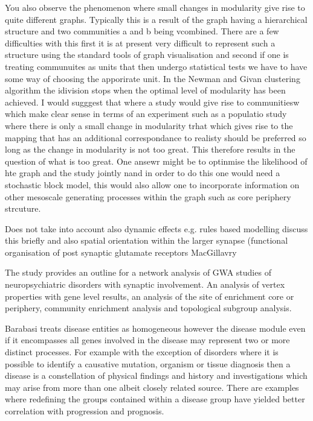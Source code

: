 You also observe the phenomenon where small changes in modularity give rise to quite different graphs. Typically this is a result of the graph having a hierarchical structure and two communities a and b being vcombined. There are a few difficulties with this first it is at present very difficult to represent such a structure using the standard tools of graph visualisation and second if one is treating communuites as units that then undergo statistical tests we have to have some way of choosing the apporirate unit. In the Newman and Givan clustering algorithm the idivision stops when the optimal level of modularity has been achieved. I would sugggest that where a study would give rise to communitiesw which make clear sense in terms of an experiment such as a populatio study where there is only a small change in modularity trhat which gives rise to the mapping that has an additional correspondance to realisty should be preferred so long as the change in modularity is not too great. This therefore results in the question of what is too great. One ansewr might be to optinmise the likelihood of hte graph and the study jointly nand in order to do this one would need a stochastic block model, this would also allow one to incorporate information on other mesoscale generating processes within the graph such as core periphery strcuture.

Does not take into account also dynamic effects e.g. rules based modelling discuss this briefly and also spatial orientation within the larger synapse (functional organisation of post synaptic glutamate receptors MacGillavry

The study provides an outline for a network analysis of GWA studies of neuropsychiatric disorders with synaptic involvement. An analysis of vertex properties with gene level results, an analysis of the site of enrichment core or periphery, community enrichment analysis and topological subgroup analysis. 

Barabasi treats disease entities as homogeneous however the disease module even if it encompasses all genes involved in the disease may represent two or more distinct processes. For example with the exception of disorders where it is possible to identify a causative mutation, organism or tissue diagnosis then a disease is a constellation of physical findings and history and investigations which may arise from more than one albeit closely related source. There are examples where redefining the groups contained within a disease group have yielded better correlation with progression and prognosis. 

